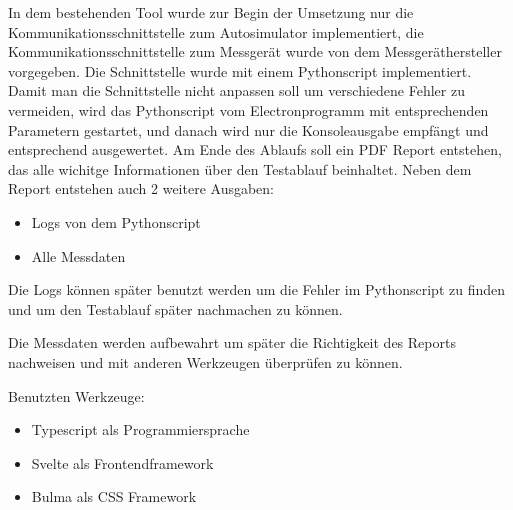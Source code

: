         In dem bestehenden Tool wurde zur Begin der Umsetzung nur die Kommunikationsschnittstelle zum  Autosimulator implementiert,
        die Kommunikationsschnittstelle zum Messgerät wurde von dem Messgeräthersteller vorgegeben. Die Schnittstelle wurde mit einem Pythonscript implementiert.
        Damit man die Schnittstelle nicht anpassen soll um verschiedene Fehler zu vermeiden, wird das Pythonscript vom Electronprogramm mit entsprechenden Parametern gestartet, 
        und danach wird nur die Konsoleausgabe empfängt und entsprechend ausgewertet. Am Ende des Ablaufs soll ein PDF Report entstehen, das alle wichitge Informationen
        über den Testablauf beinhaltet. Neben dem Report entstehen auch 2 weitere Ausgaben:
        \begin{itemize}
            \item Logs von dem Pythonscript
            \item Alle Messdaten
        \end{itemize}

        Die Logs können später benutzt werden um die Fehler im Pythonscript zu finden und um den Testablauf später nachmachen zu können.

        Die Messdaten werden aufbewahrt um später die Richtigkeit des Reports nachweisen und mit anderen Werkzeugen überprüfen zu können.

        Benutzten Werkzeuge:
        \begin{itemize}
            \item Typescript als Programmiersprache
            \item Svelte als Frontendframework
            \item Bulma als CSS Framework
        \end{itemize}

